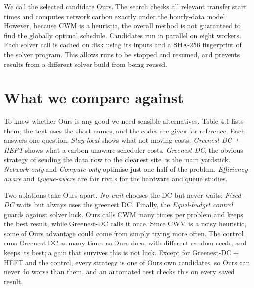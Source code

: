 \documentclass[12pt,a4paper,oneside,openany]{report}
\begin{document}
We call the selected candidate Ours. The search checks all relevant
transfer start times and computes network carbon exactly under the
hourly-data model. However, because CWM is a heuristic, the overall
method is not guaranteed to find the globally optimal schedule.
Candidates run in parallel on eight workers. Each solver call is cached
on disk using its inputs and a SHA-256 fingerprint of the solver
program. This allows runs to be stopped and resumed, and prevents
results from a different solver build from being reused.

\section{What we compare against}\label{sec:4.3}

To know whether Ours is any good we need sensible alternatives. Table
4.1 lists them; the text uses the short names, and the codes are given
for reference. Each answers one question. \emph{Stay-local} shows what
not moving costs. \emph{Greenest-DC + HEFT} shows what a carbon-unaware
scheduler costs. \emph{Greenest-DC}, the obvious strategy of sending the
data now to the cleanest site, is the main yardstick.
\emph{Network-only} and \emph{Compute-only} optimise just one half of
the problem. \emph{Efficiency-aware} and \emph{Queue-aware} are fair
rivals for the hardware and queue studies.

Two ablations take Ours apart. \emph{No-wait} chooses the DC but never
waits; \emph{Fixed-DC} waits but always uses the greenest DC. Finally,
the \emph{Equal-budget control} guards against solver luck. Ours calls
CWM many times per problem and keeps the best result, while Greenest-DC
calls it once. Since CWM is a noisy heuristic, some of
Ours\textquotesingle{} advantage could come from simply trying more
often. The control runs Greenest-DC as many times as Ours does, with
different random seeds, and keeps its best; a gain that survives this is
not luck. Except for Greenest-DC + HEFT and the control, every strategy
is one of Ours\textquotesingle{} own candidates, so Ours can never do
worse than them, and an automated test checks this on every saved
result.
\end{document}
